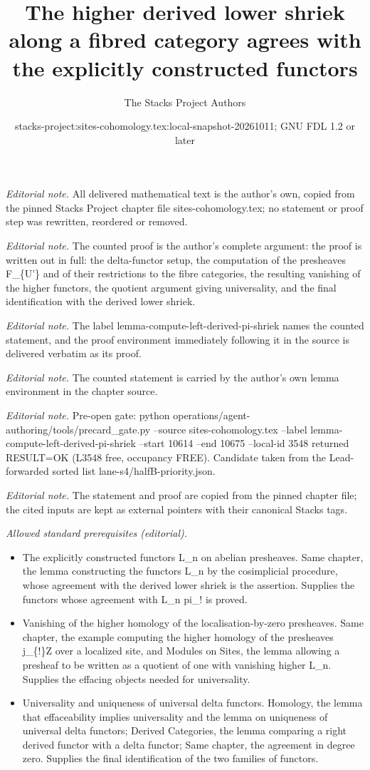 \documentclass[10pt,a4paper]{amsart}
\title{The higher derived lower shriek along a fibred category agrees with the explicitly constructed functors}
\author{The Stacks Project Authors}
\date{stacks-project:sites-cohomology.tex:local-snapshot-20261011; GNU FDL 1.2 or later}
\theoremstyle{plain}
\theoremstyle{definition}
\theoremstyle{remark}
\numberwithin{equation}{subsection}
\begin{document}
\maketitle
\noindent\textit{Editorial note.} All delivered mathematical text is the author's own, copied from the pinned Stacks Project chapter file sites-cohomology.tex; no statement or proof step was rewritten, reordered or removed.\par\medskip
\noindent\textit{Editorial note.} The counted proof is the author's complete argument: the proof is written out in full: the delta-functor setup, the computation of the presheaves F\_\{U'\} and of their restrictions to the fibre categories, the resulting vanishing of the higher functors, the quotient argument giving universality, and the final identification with the derived lower shriek.\par\medskip
\noindent\textit{Editorial note.} The label lemma-compute-left-derived-pi-shriek names the counted statement, and the proof environment immediately following it in the source is delivered verbatim as its proof.\par\medskip
\noindent\textit{Editorial note.} The counted statement is carried by the author's own lemma environment in the chapter source.\par\medskip
\noindent\textit{Editorial note.} Pre-open gate: python operations/agent-authoring/tools/precard\_gate.py --source sites-cohomology.tex --label lemma-compute-left-derived-pi-shriek --start 10614 --end 10675 --local-id 3548 returned RESULT=OK (L3548 free, occupancy FREE). Candidate taken from the Lead-forwarded sorted list lane-s4/halfB-priority.json.\par\medskip
\noindent\textit{Editorial note.} The statement and proof are copied from the pinned chapter file; the cited inputs are kept as external pointers with their canonical Stacks tags.\par\medskip
\noindent\textit{Allowed standard prerequisites (editorial).}\begin{itemize}
\item The explicitly constructed functors L\_n on abelian presheaves. Same chapter, the lemma constructing the functors L\_n by the cosimplicial procedure, whose agreement with the derived lower shriek is the assertion. Supplies the functors whose agreement with L\_n pi\_! is proved.
\item Vanishing of the higher homology of the localisation-by-zero presheaves. Same chapter, the example computing the higher homology of the presheaves j\_\{!\}Z over a localized site, and Modules on Sites, the lemma allowing a presheaf to be written as a quotient of one with vanishing higher L\_n. Supplies the effacing objects needed for universality.
\item Universality and uniqueness of universal delta functors. Homology, the lemma that effaceability implies universality and the lemma on uniqueness of universal delta functors; Derived Categories, the lemma comparing a right derived functor with a delta functor; Same chapter, the agreement in degree zero. Supplies the final identification of the two families of functors.
\end{itemize}\medskip
\end{document}
